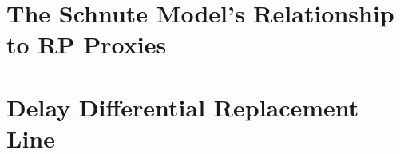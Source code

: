 \documentclass[12pt]{ucscthesis}
\begin{document}
%
\chapter{The Schnute Model's Relationship to RP Proxies \label{proxyMath}}


%
\chapter{Delay Differential Replacement Line}






\def\baselinestretch{1.0}\large\normalsize



%
%
%
%
%
%
%
%
%

%
\end{document}

